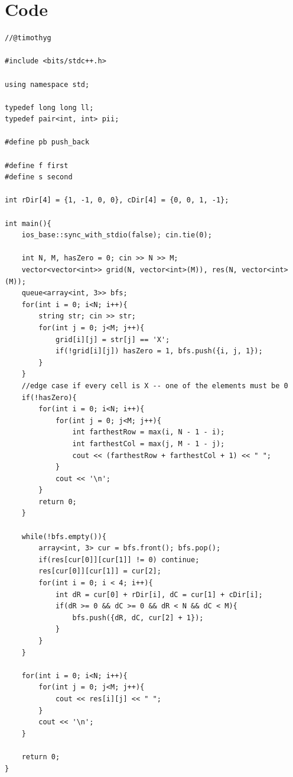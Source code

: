 \documentclass[15pt]{article}
\begin{document}
\section{Code}
\begin{lstlisting}
//@timothyg

#include <bits/stdc++.h>
 
using namespace std;
 
typedef long long ll;
typedef pair<int, int> pii;

#define pb push_back

#define f first
#define s second

int rDir[4] = {1, -1, 0, 0}, cDir[4] = {0, 0, 1, -1};

int main(){
    ios_base::sync_with_stdio(false); cin.tie(0);
    
    int N, M, hasZero = 0; cin >> N >> M;
    vector<vector<int>> grid(N, vector<int>(M)), res(N, vector<int>(M));
    queue<array<int, 3>> bfs;
    for(int i = 0; i<N; i++){
        string str; cin >> str;
        for(int j = 0; j<M; j++){
            grid[i][j] = str[j] == 'X';
            if(!grid[i][j]) hasZero = 1, bfs.push({i, j, 1});
        }
    }
    //edge case if every cell is X -- one of the elements must be 0
    if(!hasZero){
        for(int i = 0; i<N; i++){
            for(int j = 0; j<M; j++){
                int farthestRow = max(i, N - 1 - i);
                int farthestCol = max(j, M - 1 - j);
                cout << (farthestRow + farthestCol + 1) << " ";
            }
            cout << '\n';
        }
        return 0;
    }

    while(!bfs.empty()){
        array<int, 3> cur = bfs.front(); bfs.pop();
        if(res[cur[0]][cur[1]] != 0) continue;
        res[cur[0]][cur[1]] = cur[2];
        for(int i = 0; i < 4; i++){
            int dR = cur[0] + rDir[i], dC = cur[1] + cDir[i];
            if(dR >= 0 && dC >= 0 && dR < N && dC < M){
                bfs.push({dR, dC, cur[2] + 1});
            }
        }
    }

    for(int i = 0; i<N; i++){
        for(int j = 0; j<M; j++){
            cout << res[i][j] << " ";
        }
        cout << '\n';
    }

    return 0;
}
\end{lstlisting}
\end{document}
